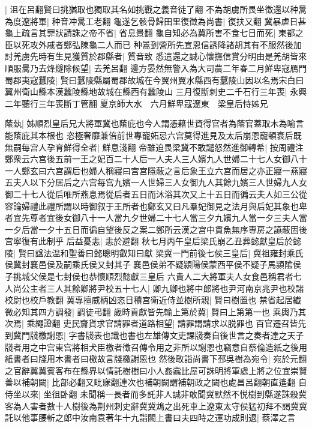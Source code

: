 |{
	沮在呂翻賢曰挑猶取也獨取其名如挑戰之義音徒了翻}
不為胡虜所畏坐徵還以种暠為度遼將軍|{
	种音冲暠工老翻}
龜遂乞骸骨歸田里復徵為尚書|{
	復扶又翻}
冀暴虐日甚龜上疏言其罪狀請誅之帝不省|{
	省息景翻}
龜自知必為冀所害不食七日而死|{
	東都之臣以死攻外戚者鄭弘陳龜二人而已}
种暠到營所先宣恩信誘降諸胡其有不服然後加討羌虜先時有生見獲質於郡縣者|{
	質音致}
悉遣還之誠心懷撫信賞分明由是羌胡皆來順服暠乃去烽燧除候望|{
	去羌呂翻}
邊方晏然無警入為大司農二年春二月鮮卑寇鴈門　蜀郡夷寇蠶陵|{
	賢曰蠶陵縣屬蜀郡故城在今翼州翼水縣西有蠶陵山因以名焉宋白曰翼州衛山縣本漢蠶陵縣地故城在縣西有蠶陵山}
三月復斷刺史二千石行三年喪|{
	永興二年聽行三年喪斷丁管翻}
夏京師大水　六月鮮卑寇遼東　梁皇后恃姊兄

䕃埶|{
	姊順烈皇后兄大將軍冀也䕃庇也今人謂憑藉世資得官者為䕃官蓋取木為喻言能䕃庇其本根也}
恣極奢靡兼倍前世專寵妬忌六宫莫得進見及太后崩恩寵頓衰后既無嗣每宫人孕育鮮得全者|{
	鮮息淺翻}
帝雖迫畏梁冀不敢譴怒然進御轉希|{
	按周禮注鄭衆云六宫後五前一王之妃百二十人后一人夫人三人嬪九人世婦二十七人女御八十一人鄭玄曰六宫謂后也婦人稱寢曰宫宫隱蔽之言后象王立六宫而居之亦正寢一燕寢五夫人以下分居后之六宫每宫九嬪一人世婦三人女御九人其餘九嬪三人世婦九人女御二十七人從后唯所燕息焉從后者五日而沐浴其次又上十五日而徧云夫人如三公從容論婦禮此禮所謂以時御叙于王所者也鄭玄又曰凡羣妃御見之法月與后妃其象也卑者宜先尊者宜後女御八十一人當九夕世婦二十七人當三夕九嬪九人當一夕三夫人當一夕后當一夕十五日而徧自望後反之案二鄭所云漢之宫中貫魚無序專房之讌蔽固後宫寧復有此制乎}
后益憂恚|{
	恚於避翻}
秋七月丙午皇后梁氏崩乙丑葬懿獻皇后於懿陵|{
	賢曰諡法温和聖善曰懿聰明叡知曰獻}
梁冀一門前後七侯三皇后|{
	冀祖雍封乘氏侯冀封襄邑侯及嗣乘氏侯又封其子襄邑侯弟不疑潁陽侯蒙西平侯不疑子馬潁隂侯子挑城父侯是七封侯也恭懷順烈懿獻三皇后}
六貴人二大將軍夫人女食邑稱君者七人尚公主者三人其餘卿將尹校五十七人|{
	卿九卿也將中郎將也尹河南京兆尹也校諸校尉也校戶教翻}
冀專擅威柄凶恣日積宫衛近侍並樹所親|{
	賢曰樹置也}
禁省起居纎微必知其四方調發|{
	調徒弔翻}
歲時貢獻皆先輸上第於冀|{
	賢曰上第第一也}
乘輿乃其次焉|{
	乘繩證翻}
吏民齎貨求官請罪者道路相望|{
	請罪謂請求以脱罪也}
百官遷召皆先到冀門牋檄謝恩|{
	字書牋表也識也書也左雄傳文吏課牋奏自後世言之奏者達之天子牋者用之中宫東宫將相犬臣檄者徵召傳令用之非所以謝恩也竊意自蔡倫造紙之後用紙書者曰牋用木書者曰檄故言牋檄謝恩也}
然後敢詣尚書下邳吳樹為宛令|{
	宛於元翻}
之官辭冀冀賓客布在縣界以情託樹樹曰小人姦蠧比屋可誅明將軍處上將之位宜崇賢善以補朝闕|{
	比部必翻又毗寐翻連次也補朝闕謂補朝政之闕也處昌呂翻朝直遙翻}
自侍坐以來|{
	坐徂卧翻}
未聞稱一長者而多託非人誠非敢聞冀默然不悦樹到縣遂誅殺冀客為人害者數十人樹後為荆州刺史辭冀冀鴆之出死車上遼東太守侯猛初拜不謁冀冀託以他事腰斬之郎中汝南袁著年十九詣闕上書曰夫四時之運功成則退|{
	蔡澤之言}
